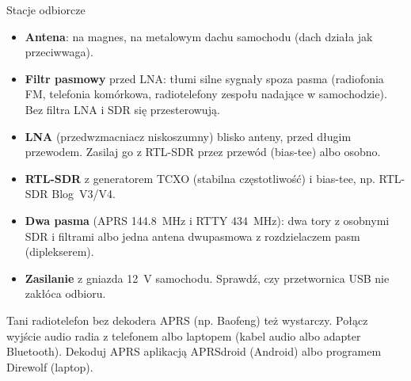 \begin{sekcja}{Stacje odbiorcze}
\begin{itemize}
  \item \textbf{Antena}: na magnes, na metalowym dachu samochodu (dach działa jak przeciwwaga).
  \item \textbf{Filtr pasmowy} przed LNA: tłumi silne sygnały spoza pasma (radiofonia FM, telefonia komórkowa, radiotelefony zespołu nadające w samochodzie). Bez filtra LNA i SDR się przesterowują.
  \item \textbf{LNA} (przedwzmacniacz niskoszumny) blisko anteny, przed długim przewodem. Zasilaj go z RTL-SDR przez przewód (bias-tee) albo osobno.
  \item \textbf{RTL-SDR} z generatorem TCXO (stabilna częstotliwość) i bias-tee, np. RTL-SDR Blog~V3/V4.
  \item \textbf{Dwa pasma} (APRS \SI{144.8}{MHz} i RTTY \SI{434}{MHz}): dwa tory z osobnymi SDR i filtrami albo jedna antena dwupasmowa z rozdzielaczem pasm (diplekserem).
  \item \textbf{Zasilanie} z gniazda \SI{12}{V} samochodu. Sprawdź, czy przetwornica USB nie zakłóca odbioru.
\end{itemize}

\begin{wskazowka}Tani radiotelefon bez dekodera APRS (np. Baofeng) też wystarczy. Połącz wyjście audio radia z telefonem albo laptopem (kabel audio albo adapter Bluetooth). Dekoduj APRS aplikacją APRSdroid (Android) albo programem Direwolf (laptop).\end{wskazowka}

\end{sekcja}

